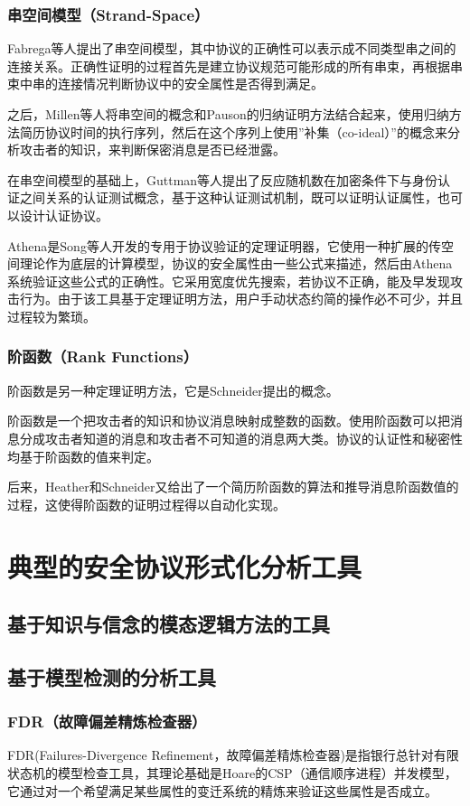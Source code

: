 \documentclass[cs4size,a4pape,UTF8]{ctexart}
\numberwithin{equation}{section}
\numberwithin{table}{section}
\numberwithin{figure}{section}
\begin{document}
\subsubsection{串空间模型（Strand-Space）}
Fabrega等人提出了串空间模型，其中协议的正确性可以表示成不同类型串之间的连接关系。正确性证明的过程首先是建立协议规范可能形成的所有串束，再根据串束中串的连接情况判断协议中的安全属性是否得到满足。

之后，Millen等人将串空间的概念和Pauson的归纳证明方法结合起来，使用归纳方法简历协议时间的执行序列，然后在这个序列上使用''补集（co-ideal）''的概念来分析攻击者的知识，来判断保密消息是否已经泄露。

在串空间模型的基础上，Guttman等人提出了反应随机数在加密条件下与身份认证之间关系的认证测试概念，基于这种认证测试机制，既可以证明认证属性，也可以设计认证协议。

Athena是Song等人开发的专用于协议验证的定理证明器，它使用一种扩展的传空间理论作为底层的计算模型，协议的安全属性由一些公式来描述，然后由Athena系统验证这些公式的正确性。它采用宽度优先搜索，若协议不正确，能及早发现攻击行为。由于该工具基于定理证明方法，用户手动状态约简的操作必不可少，并且过程较为繁琐\cite{6}。

\subsubsection{阶函数（Rank Functions）}
阶函数是另一种定理证明方法，它是Schneider提出的概念。

阶函数是一个把攻击者的知识和协议消息映射成整数的函数。使用阶函数可以把消息分成攻击者知道的消息和攻击者不可知道的消息两大类。协议的认证性和秘密性均基于阶函数的值来判定。

后来，Heather和Schneider又给出了一个简历阶函数的算法和推导消息阶函数值的过程，这使得阶函数的证明过程得以自动化实现\cite{6}。

\section{典型的安全协议形式化分析工具}
\subsection{基于知识与信念的模态逻辑方法的工具}
\subsection{基于模型检测的分析工具}
\subsubsection{FDR（故障偏差精炼检查器）}
FDR(Failures-Divergence Refinement，故障偏差精炼检查器)是指银行总针对有限状态机的模型检查工具，其理论基础是Hoare的CSP（通信顺序进程）并发模型，它通过对一个希望满足某些属性的变迁系统的精炼来验证这些属性是否成立。
\end{document}

